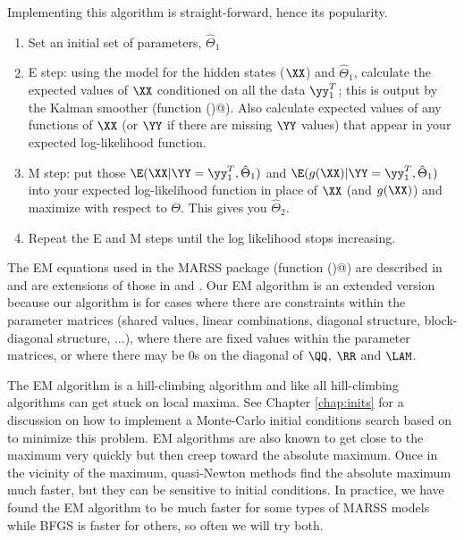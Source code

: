 Implementing this algorithm is straight-forward, hence its popularity.
\begin{enumerate}
	\item Set an initial set of parameters, $\hat{\Theta}_1$
	\item E step: using the model for the hidden states ($\XX$) and $\hat{\Theta}_1$, calculate the expected values of $\XX$ conditioned on all the data $\yy_1^T$; this is \verb@xtT@ output by the Kalman smoother (function \verb@MARSSkf()@).  Also calculate expected values of any functions of $\XX$ (or $\YY$ if there are missing $\YY$ values) that appear in your expected log-likelihood function.
	\item M step: put those $\E(\XX | \YY=\yy_1^T, \hat{\Theta}_1)$ and $\E(g(\XX) | \YY=\yy_1^T, \hat{\Theta}_1)$ into your expected log-likelihood function in place of $\XX$ (and $g(\XX)$) and maximize with respect to $\Theta$.  This gives you $\hat{\Theta}_2$.
	\item Repeat the E and M steps until the log likelihood stops increasing.
\end{enumerate}

The EM equations used in the MARSS package (function \verb@MARSSkem()@) are described in \citet{Holmes2010} and are extensions of those in \citet{ShumwayStoffer1982} and \citet{GhahramaniHinton1996}.  Our EM algorithm is an extended version because our algorithm is for cases where there are constraints within the parameter matrices (shared values, linear combinations, diagonal structure, block-diagonal structure, ...), where there are fixed values within the parameter matrices, or where there may be 0s on the diagonal of $\QQ$, $\RR$ and $\LAM$.

The EM algorithm is a hill-climbing algorithm and like all hill-climbing algorithms can get stuck on local maxima.  See Chapter \ref{chap:inits} for a discussion on how to implement a Monte-Carlo initial conditions search based on \citet{Biernackietal2003} to minimize this problem.  EM algorithms are also known to get close to the maximum very quickly but then creep toward the absolute maximum.  Once in the vicinity of the maximum, quasi-Newton methods find the absolute maximum much faster, but they can be  sensitive to initial conditions. In practice, we have found the EM algorithm to be much faster for some types of MARSS models while BFGS is faster for others, so often we will try both.

